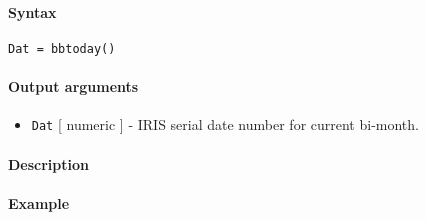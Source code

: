 


	\paragraph{Syntax}

\begin{verbatim}
Dat = bbtoday()
\end{verbatim}

\paragraph{Output arguments}

\begin{itemize}
\itemsep1pt\parskip0pt
\item
  \texttt{Dat} {[} numeric {]} - IRIS serial date number for current
  bi-month.
\end{itemize}

\paragraph{Description}

\paragraph{Example}


